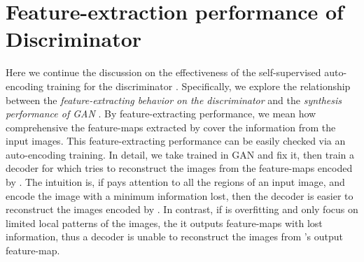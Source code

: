 \documentclass{article} \usepackage{iclr2021_conference,times}
\begin{document}
\section{Feature-extraction performance of Discriminator}
\begin{table}[h]
\caption{LPIPS on 's feature-extracting performance}
\label{table:d-decoder}
\begin{center}
\end{center}
\end{table}

Here we continue the discussion on the effectiveness of the self-supervised auto-encoding training for the discriminator . Specifically, we explore the relationship between the \textit{ feature-extracting behavior on the discriminator  } and the \textit{ synthesis performance of GAN }. By feature-extracting performance, we mean how comprehensive the feature-maps extracted by  cover the information from the input images. This feature-extracting performance can be easily checked via an auto-encoding training. In detail, we take  trained in GAN and fix it, then train a decoder for  which tries to reconstruct the images from the feature-maps encoded by . The intuition is, if  pays attention to all the regions of an input image, and encode the image with a minimum information lost, then the decoder is easier to reconstruct the images encoded by . In contrast, if  is overfitting and only focus on limited local patterns of the images, the it outputs feature-maps with lost information, thus a decoder is unable to reconstruct the images from 's output feature-map.  
\end{document}
